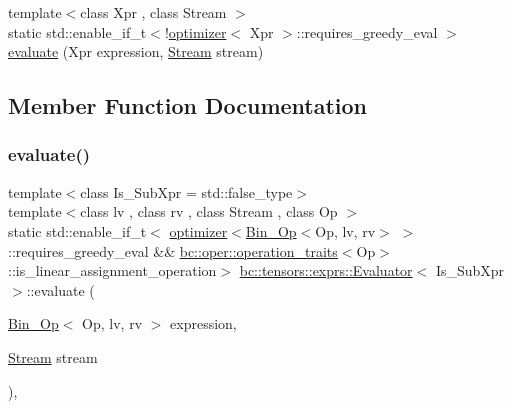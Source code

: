 \begin{DoxyCompactItemize}
\item 
{\footnotesize template$<$class Xpr , class Stream $>$ }\\static std\+::enable\+\_\+if\+\_\+t$<$!\hyperlink{structbc_1_1tensors_1_1exprs_1_1optimizer}{optimizer}$<$ Xpr $>$\+::requires\+\_\+greedy\+\_\+eval $>$ \hyperlink{classbc_1_1tensors_1_1exprs_1_1Evaluator_aff9a73b45c8d614326f1675e86970312}{evaluate} (Xpr expression, \hyperlink{classbc_1_1streams_1_1Stream}{Stream} stream)
\end{DoxyCompactItemize}


\subsection{Member Function Documentation}
\mbox{\label{classbc_1_1tensors_1_1exprs_1_1Evaluator_a9a43e40f6f00a9e055b9d136a3120cab}} 
\subsubsection{\texorpdfstring{evaluate()}{evaluate()}\hspace{0.1cm}{\footnotesize\ttfamily [1/4]}}
{\footnotesize\ttfamily template$<$class Is\+\_\+\+Sub\+Xpr  = std\+::false\+\_\+type$>$ \\
template$<$class lv , class rv , class Stream , class Op $>$ \\
static std\+::enable\+\_\+if\+\_\+t$<$ \hyperlink{structbc_1_1tensors_1_1exprs_1_1optimizer}{optimizer}$<$\hyperlink{structbc_1_1tensors_1_1exprs_1_1Bin__Op}{Bin\+\_\+\+Op}$<$Op, lv, rv$>$ $>$\+::requires\+\_\+greedy\+\_\+eval \&\& \hyperlink{structbc_1_1oper_1_1operation__traits}{bc\+::oper\+::operation\+\_\+traits}$<$Op$>$\+::is\+\_\+linear\+\_\+assignment\+\_\+operation$>$ \hyperlink{classbc_1_1tensors_1_1exprs_1_1Evaluator}{bc\+::tensors\+::exprs\+::\+Evaluator}$<$ Is\+\_\+\+Sub\+Xpr $>$\+::evaluate (\begin{DoxyParamCaption}\item[{\hyperlink{structbc_1_1tensors_1_1exprs_1_1Bin__Op}{Bin\+\_\+\+Op}$<$ Op, lv, rv $>$}]{expression,  }\item[{\hyperlink{classbc_1_1streams_1_1Stream}{Stream}}]{stream }\end{DoxyParamCaption})\hspace{0.3cm}{\ttfamily [inline]}, {\ttfamily [static]}}

